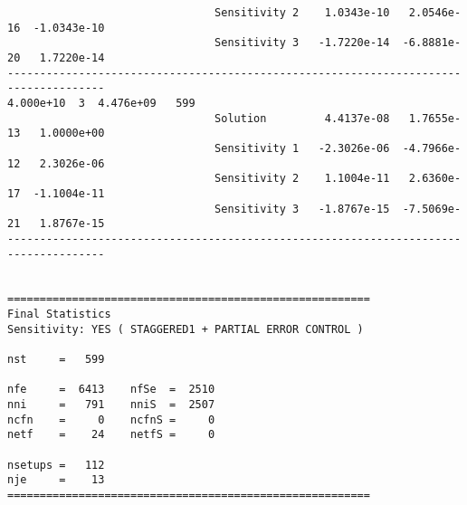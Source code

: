 \begin{verbatim}
                                Sensitivity 2    1.0343e-10   2.0546e-16  -1.0343e-10 
                                Sensitivity 3   -1.7220e-14  -6.8881e-20   1.7220e-14 
-------------------------------------------------------------------------------------
4.000e+10  3  4.476e+09   599
                                Solution         4.4137e-08   1.7655e-13   1.0000e+00 
                                Sensitivity 1   -2.3026e-06  -4.7966e-12   2.3026e-06 
                                Sensitivity 2    1.1004e-11   2.6360e-17  -1.1004e-11 
                                Sensitivity 3   -1.8767e-15  -7.5069e-21   1.8767e-15 
-------------------------------------------------------------------------------------


========================================================
Final Statistics
Sensitivity: YES ( STAGGERED1 + PARTIAL ERROR CONTROL )

nst     =   599                

nfe     =  6413    nfSe  =  2510  
nni     =   791    nniS  =  2507  
ncfn    =     0    ncfnS =     0  
netf    =    24    netfS =     0

nsetups =   112                  
nje     =    13                  
========================================================
\end{verbatim}